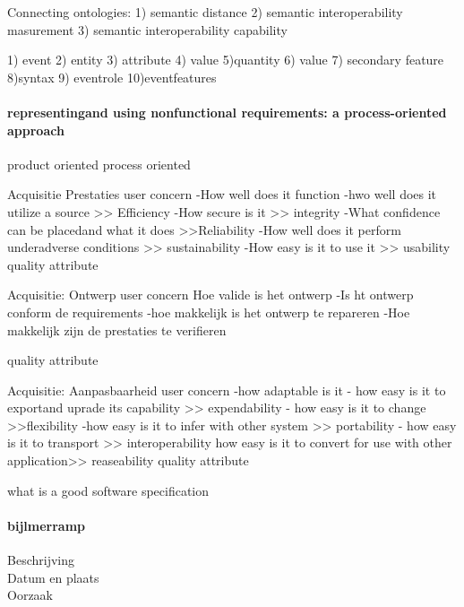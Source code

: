 Connecting ontologies:
1) semantic distance
2) semantic interoperability masurement
3) semantic interoperability capability

1) event
2) entity
3) attribute
4) value
5)quantity
6) value
7) secondary feature
8)syntax
9) eventrole
10)eventfeatures




\paragraph{representingand using nonfunctional requirements: a process-oriented approach}
product oriented
process oriented


Acquisitie Prestaties
user concern
-How well does it function
-hwo well does it utilize a source >> Efficiency
-How secure is it >> integrity
-What confidence can be placedand what it does >>Reliability
-How well does it perform underadverse conditions >> sustainability
-How easy is it to use it >> usability
quality attribute


Acquisitie: Ontwerp
user concern
Hoe valide is het ontwerp
-Is ht ontwerp conform de requirements
-hoe makkelijk is het ontwerp te repareren
-Hoe makkelijk zijn de prestaties te verifieren

quality attribute


Acquisitie: Aanpasbaarheid
user concern
-how adaptable is it
- how easy is it to exportand uprade its capability >> expendability
- how easy is it to change >>flexibility
-how easy is it to infer with other system >> portability
- how easy is it to transport >> interoperability
how easy is it to convert for use with other application>> reaseability
quality attribute


what is a good software specification

\cite{fvaandrager2322010Goodmodel}
\cite{onix01102022devopmodel}
\cite{sulemani04012021softwareprocesmodel}
\cite{globalluxsoft18102017softdev}
\cite{wiegers30052022SRS}
\cite{muller06092020goodspecification}
\cite{informit30062008reqmanagement}
\cite{altexsoft15092020writingSRS}





\paragraph{bijlmerramp}

\begin{description}
	\item[Beschrijving]
	\item[Datum en plaats] 
	\item[Oorzaak]
\end{description}


